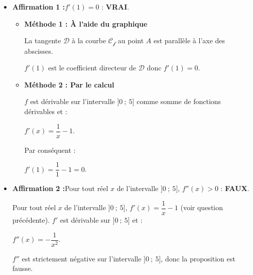 \begin{corrige}
     \begin{itemize}
          \item %
          \textbf{Affirmation 1 :}\quad $f'(1)=0$ : \textbf{VRAI}.
          \par
          \begin{itemize}
               \item
               \textbf{Méthode 1 : \`A l'aide du graphique}
               \par
               La tangente $\mathscr{D}$ à la courbe $\mathscr{C_f}$ au point $A$ est parallèle à l'axe des abscisses.
               \par
               $f'(1)$ est le coefficient directeur de $\mathscr{D}$ donc $f'(1)=0$.
               \par
               \vspace{0.5cm}
               \item
               \textbf{Méthode 2 : Par le calcul}
               \par
               $f$ est dérivable sur l'intervalle $]0~;~5]$ comme somme de fonctions dérivables et :
               \par
               $f'(x)=\dfrac{1}{x}-1$.
               \par
               Par conséquent :
               \par
               $f'(1)=\dfrac{1}{1}-1=0$.
               \par
          \end{itemize}
          \item %
          \textbf{Affirmation 2 :}\quad Pour tout réel $x$ de l'intervalle $]0~;~5]$, $f''(x)>0$ : \textbf{FAUX}.
          \par
          Pour tout réel $x$ de l'intervalle $]0~;~5]$, $f'(x)=\dfrac{1}{x}-1$ (voir question précédente). $f'$ est dérivable sur $]0~;~5]$ et :
          \par
          $f''(x)=-\dfrac{1}{x^2}.$
          \par
          $f''$ est strictement négative sur l'intervalle $]0~;~5]$, donc la proposition est fausse.

\end{itemize}
\end{corrige}
